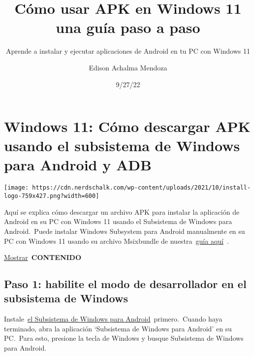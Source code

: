 \documentclass[
  letterpaper,
]{article}
\title{Cómo usar APK en Windows 11 una guía paso a paso}
\subtitle{Aprende a instalar y ejecutar aplicaciones de Android en tu PC
con Windows 11}
\author{Edison Achalma Mendoza}
\date{9/27/22}
\renewcommand*\contentsname{Table of contents}
\newcommand\contentsname{Table of contents}
\begin{document}
\maketitle
\ifdefined\Shaded\renewenvironment{Shaded}{\begin{tcolorbox}[frame hidden, borderline west={3pt}{0pt}{shadecolor}, enhanced, boxrule=0pt, breakable, interior hidden, sharp corners]}{\end{tcolorbox}}\fi

\renewcommand*\contentsname{Contenidos}
{
\hypersetup{linkcolor=}
\setcounter{tocdepth}{3}
\tableofcontents
}
\hypertarget{windows-11-cuxf3mo-descargar-apk-usando-el-subsistema-de-windows-para-android-y-adb}{%
\section{Windows 11: Cómo descargar APK usando el subsistema de Windows
para Android y
ADB}\label{windows-11-cuxf3mo-descargar-apk-usando-el-subsistema-de-windows-para-android-y-adb}}

\texttt{[image: https://cdn.nerdschalk.com/wp-content/uploads/2021/10/install-logo-759x427.png?width=600]}

Aquí se explica cómo descargar un archivo APK para instalar la
aplicación de Android en su PC con Windows 11 usando el Subsistema de
Windows para Android.~Puede instalar Windows Subsystem para Android
manualmente en su PC con Windows 11 usando su archivo Msixbundle de
nuestra~\href{https://nerdschalk.com/android-apps-on-windows-11-dev-channel-how-to-install-windows-subsystem-for-android-manually-with-msixbundle/}{guía
aquí}~.

\href{https://nerdschalk.com/windows-11-how-to-sideload-apk-using-windows-subsystem-for-android-and-adb/\#}{Mostrar}~\textbf{CONTENIDO}~\href{https://nerdschalk.com/windows-11-how-to-sideload-apk-using-windows-subsystem-for-android-and-adb/\#}{}

\hypertarget{paso-1-habilite-el-modo-de-desarrollador-en-el-subsistema-de-windows}{%
\subsection{Paso 1: habilite el modo de desarrollador en el subsistema
de
Windows}\label{paso-1-habilite-el-modo-de-desarrollador-en-el-subsistema-de-windows}}

Instale~\href{https://nerdschalk.com/android-apps-on-windows-11-dev-channel-how-to-install-windows-subsystem-for-android-manually-with-msixbundle/}{el
Subsistema de Windows para Android}~primero.~Cuando haya terminado, abra
la aplicación `Subsistema de Windows para Android' en su PC.~Para esto,
presione la tecla de Windows y busque Subsistema de Windows para
Android.
\end{document}
